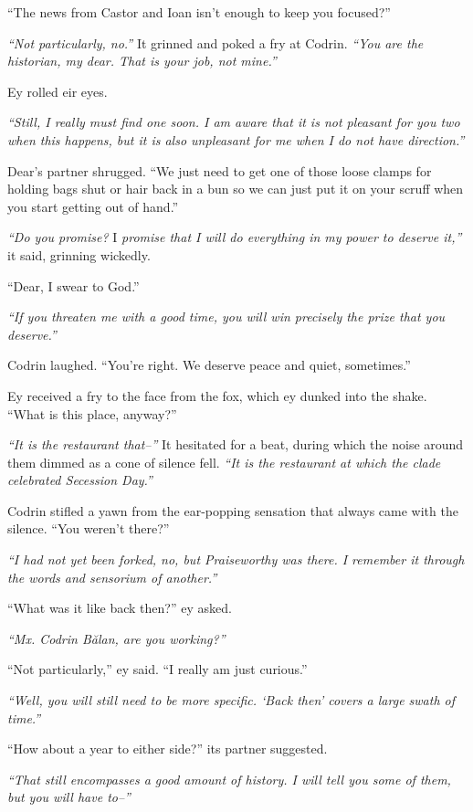 ``The news from Castor and Ioan isn't enough to keep you focused?''

\emph{``Not particularly, no.''} It grinned and poked a fry at Codrin. \emph{``You are the historian, my dear. That is your job, not mine.''}

Ey rolled eir eyes.

\emph{``Still, I really must find one soon. I am aware that it is not pleasant for you two when this happens, but it is also unpleasant for me when I do not have direction.''}

Dear's partner shrugged. ``We just need to get one of those loose clamps for holding bags shut or hair back in a bun so we can just put it on your scruff when you start getting out of hand.''

\emph{``Do you promise?} I \emph{promise that I will do everything in my power to deserve it,''} it said, grinning wickedly.

``Dear, I swear to God.''

\emph{``If you threaten me with a good time, you will win precisely the prize that you deserve.''}

Codrin laughed. ``You're right. We deserve peace and quiet, sometimes.''

Ey received a fry to the face from the fox, which ey dunked into the shake. ``What is this place, anyway?''

\emph{``It is the restaurant that--''} It hesitated for a beat, during which the noise around them dimmed as a cone of silence fell. \emph{``It is the restaurant at which the clade celebrated Secession Day.''}

Codrin stifled a yawn from the ear-popping sensation that always came with the silence. ``You weren't there?''

\emph{``I had not yet been forked, no, but Praiseworthy was there. I remember it through the words and sensorium of another.''}

``What was it like back then?'' ey asked.

\emph{``Mx. Codrin Bălan, are you working?''}

``Not particularly,'' ey said. ``I really am just curious.''

\emph{``Well, you will still need to be more specific. `Back then' covers a large swath of time.''}

``How about a year to either side?'' its partner suggested.

\emph{``That still encompasses a good amount of history. I will tell you some of them, but you will have to--''}

